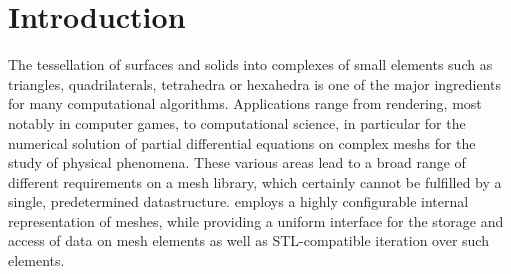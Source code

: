 
\chapter*{Introduction}    \label{intro}

The tessellation of surfaces and solids into complexes of small elements such as triangles, quadrilaterals, tetrahedra or hexahedra is one of the major ingredients for many computational algorithms.
Applications range from rendering, most notably in computer games, to computational science, in particular for the numerical solution of partial differential equations on complex meshs for the study of physical phenomena.
These various areas lead to a broad range of different requirements on a mesh library, which certainly cannot be fulfilled by a single, predetermined datastructure.
{\ViennaGrid} employs a highly configurable internal representation of meshes, while providing a uniform interface for the storage and access of data on mesh elements as well as STL-compatible iteration over such elements.

